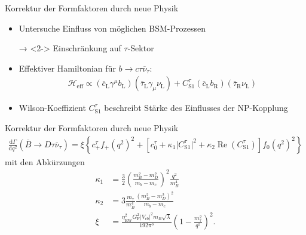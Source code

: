 \documentclass[fleqn, aspectratio=1610, professionalfonts, 9pt]{beamer}
\begin{document}
\begin{frame}{Korrektur der Formfaktoren durch neue Physik}
  \begin{itemize}
    \setlength\itemsep{1em}
    \item<1-> Untersuche Einfluss von möglichen BSM-Prozessen
    \item[→]<2-> Einschränkung auf $\tau$-Sektor
    \item<3-> Effektiver Hamiltonian für $b \to c \tau \overline{\nu}_\tau$:
    \begin{align*}
        \mathcal{H}_\text{eff} \propto (\overline{c}_\text{L} \gamma^\mu b_\text{L})(\overline{\tau}_\text{L} \gamma_\mu \nu_\text{L} ) +  C_{\text{S}1}^\tau (\overline {c}_\text{L} b_\text{R}) (\overline{\tau}_\text{R} \nu_\text{L})
    \end{align*}
    \item<4-> Wilson-Koeffizient $C_{\text{S}1}^\tau$ beschreibt Stärke des Einflusses der NP-Kopplung
  \end{itemize}
\end{frame}


\begin{frame}{Korrektur der Formfaktoren durch neue Physik}
  \begin{align*}
      \frac{\mathrm{d} \Gamma}{\mathrm{d} q^2} \left(\overline{B} \to D \tau \overline{\nu}_{\tau} \right) = \xi \left\lbrace c_+^{\tau} f_+(q^2)^2 + \left\lbrack c_0^{\tau} + \kappa_1 \lvert C_{\text{S}1}^{\tau} \rvert^2 + \kappa_2 \operatorname{Re}(C_{\text{S}1}^{\tau}) \right\rbrack f_0(q^2)^2 \right\rbrace
  \end{align*}
  \vspace{5px}
  mit den Abkürzungen
  \begin{align*}
      \kappa_1 &= \frac{3}{2} \left( \frac{m_B^2 - m_D^2}{m_b - m_c} \right)^2 \frac{q^2}{m_B^4}\\
      \kappa_2 &= 3  \frac{m_\tau}{m_B^4} \frac{(m_B^2 - m_D^2)^2}{m_b - m_c} \\
      \xi &= \frac{\eta_\text{EW}^2 G_\text{F}^2 \lvert V_{cb} \rvert^2 m_B \sqrt{\lambda} }{192 \pi^3} \left( 1 - \frac{m_\tau^2}{q^2} \right)^2.
  \end{align*}
  \cite{PhysRevD.88.094012}
\end{frame}
\end{document}
